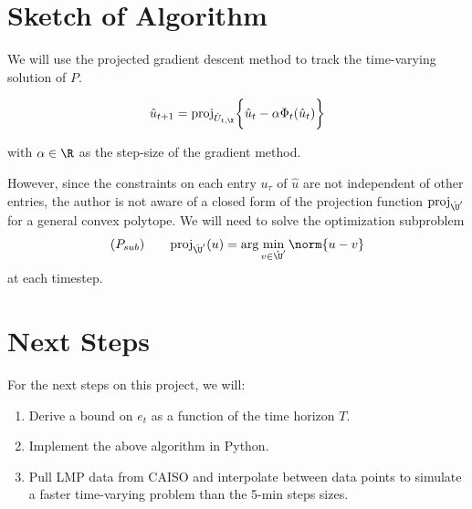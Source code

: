 \documentclass{homework}
\begin{document}
\section{Sketch of Algorithm}
We will use the projected gradient descent method to track the time-varying solution of $P$.

\begin{equation}
    \hat{u}_{t+1} = \text{proj}_{\hat{U}_{t,\X}} \biggl\{
        \hat{u}_t - \alpha \Phi_t(\hat{u}_t)
    \biggr\}
\end{equation}

with $\alpha\in\R$ as the step-size of the gradient method.

However, since the constraints on each entry $u_\tau$ of $\hat{u}$ are not independent
of other entries, the author is not aware of a closed form of the projection
function $\text{proj}_{\hat{\U}'}$ for a general convex polytope. 
We will need to solve the optimization subproblem
\begin{equation*}
    (P_{sub}) \qquad \text{proj}_{\hat{\U}'}(u) = \text{arg}\min_{v\in\hat{\U}'}
        \norm{u - v}
\end{equation*}
at each timestep.

\section{Next Steps}

For the next steps on this project, we will:
\begin{enumerate}
    \item Derive a bound on $e_t$ as a function of the time horizon $T$.
    \item Implement the above algorithm in Python.
    \item Pull LMP data from CAISO and interpolate between data points to simulate a faster time-varying
        problem than the 5-min steps sizes.
\end{enumerate}
\end{document}
